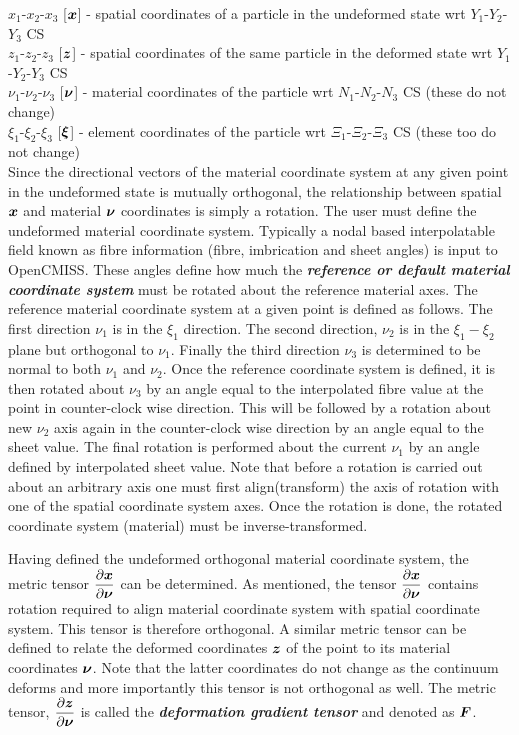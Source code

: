 \noindent $x_{1}$-$x_{2}$-$x_{3}$ [$\vect{x}$] - spatial coordinates of a particle in the undeformed state wrt $Y_{1}$-$Y_{2}$-$Y_{3}$ CS \\
$z_{1}$-$z_{2}$-$z_{3}$ [$\vect{z}$] - spatial coordinates of the same particle in the deformed state wrt $Y_{1}$-$Y_{2}$-$Y_{3}$ CS \\
$\nu_{1}$-$\nu_{2}$-$\nu_{3}$ [$\vect{\nu}$] - material coordinates of the particle wrt $N_{1}$-$N_{2}$-$N_{3}$ CS (these do not change) \\
$\xi_{1}$-$\xi_{2}$-$\xi_{3}$ [$\vect{\xi}$] - element coordinates of the particle wrt $\Xi_{1}$-$\Xi_{2}$-$\Xi_{3}$ CS (these too do not change)\\

Since the directional vectors of the material coordinate system at any given
point in the undeformed state is mutually orthogonal, the relationship between
spatial $\vect{x}$ and material $\vect{\nu}$ coordinates is simply a
rotation. The user must define the undeformed material coordinate
system. Typically a nodal based interpolatable field known as fibre
information (fibre, imbrication and sheet angles) is input to OpenCMISS. These
angles define how much the \textit{\textbf{reference or default material
    coordinate system}} must be rotated about the reference material axes. The
reference material coordinate system at a given point is defined as
follows. The first direction $\nu_{1}$ is in the $\xi_{1}$ direction. The
second direction, $\nu_{2}$ is in the $\xi_{1}-\xi_{2}$ plane but orthogonal
to $\nu_{1}$. Finally the third direction $\nu_{3}$ is determined to be normal
to both $\nu_{1}$ and $\nu_{2}$. Once the reference coordinate system is
defined, it is then rotated about $\nu_{3}$ by an angle equal to the
interpolated fibre value at the point in counter-clock wise direction. This
will be followed by a rotation about new $\nu_{2}$ axis again in the
counter-clock wise direction by an angle equal to the sheet value. The final
rotation is performed about the current $\nu_{1}$ by an angle defined by
interpolated sheet value. Note that before a rotation is carried out about an
arbitrary axis one must first align(transform) the axis of rotation with one
of the spatial coordinate system axes. Once the rotation is done, the rotated
coordinate system (material) must be inverse-transformed.

Having defined the undeformed orthogonal material coordinate system, the
metric tensor $\delby{\vect{x}}{\vect{\nu}}$ can be determined. As mentioned,
the tensor $\delby{\vect{x}}{\vect{\nu}}$ contains rotation required to align
material coordinate system with spatial coordinate system. This tensor is
therefore orthogonal. A similar metric tensor can be defined to relate the
deformed coordinates $\vect{z}$ of the point to its material coordinates
$\vect{\nu}$. Note that the latter coordinates do not change as the continuum
deforms and more importantly this tensor is not orthogonal as well. The metric
tensor, $\delby{\vect{z}}{\vect{\nu}}$ is called the
\textit{\textbf{deformation gradient tensor}} and denoted as $\matr{F}$.

